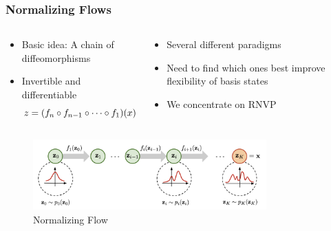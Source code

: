 \begin{frame}
    \frametitle{Normalizing Flows}
    \begin{columns}
        \begin{column}[t]{0.48\textwidth}
            \begin{itemize}[<+->]
                \setlength\itemsep{.6em}
                \item Basic idea: A chain of diffeomorphisms
                \item Invertible and differentiable
                \begin{equation*}
                    \boldmath{z} = (f_n\circ f_{n-1} \circ \dots \circ f_1 )(\boldmath{x})
                \end{equation*}
            \end{itemize}
        \end{column}
        \begin{column}[t]{0.48\textwidth}
            \begin{itemize}[<+->]
                \setlength\itemsep{.6em}
                \item Several different paradigms
                \item Need to find which ones best improve flexibility of basis states
                \item We concentrate on RNVP 
            \end{itemize}      
        \end{column}
    \end{columns}
    \begin{figure}
        \centering
        \includegraphics[width=0.8\textwidth]{img/normalizing_flow_layout.png}
        \caption{Normalizing Flow~\cite{UvA}}
        \label{fig:normalizingFlow}
    \end{figure}
\end{frame}

